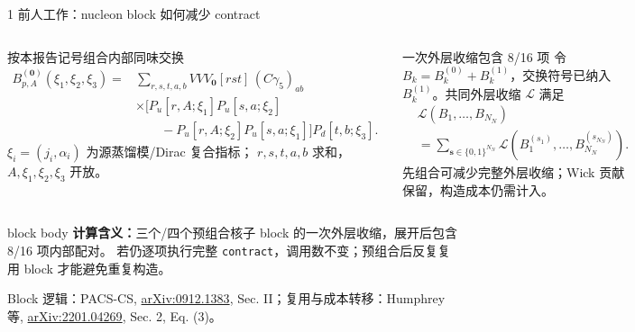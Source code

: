 \documentclass[aspectratio=169,UTF8,fontset=fandol]{ctexbeamer}
\newcommand{\smallnote}[1]{{\scriptsize\color{Muted}#1}}
\begin{document}
\begin{frame}{1 前人工作：nucleon block 如何减少 contract}
\scriptsize
\begin{columns}[T,onlytextwidth]
\begin{block}{按本报告记号组合内部同味交换}
\scriptsize
\setlength{\jot}{1pt}
\[
\begin{aligned}
B_{p,A}^{(\mathbf0)}(\xi_1,\xi_2,\xi_3)
={}&\sum_{r,s,t,a,b}VVV_{\mathbf0}[rst]\,(C\gamma_5)_{ab}\\
&\times\Big[P_u[r,A;\xi_1]P_u[s,a;\xi_2]\\
&\qquad-P_u[r,A;\xi_2]P_u[s,a;\xi_1]\Big]P_d[t,b;\xi_3].
\end{aligned}
\]
\(\xi_i=(j_i,\alpha_i)\) 为源蒸馏模/Dirac 复合指标；
\(r,s,t,a,b\) 求和，\(A,\xi_1,\xi_2,\xi_3\) 开放。
\end{block}
\begin{block}{一次外层收缩包含 8/16 项}
\scriptsize
令 \(B_k=B_k^{(0)}+B_k^{(1)}\)，交换符号已纳入 \(B_k^{(1)}\)。共同外层收缩 \(\mathcal L\) 满足
\[
\begin{aligned}
&\mathcal L(B_1,\ldots,B_{N_N})\\
&=\sum_{\boldsymbol s\in\{0,1\}^{N_N}}
\mathcal L(B_1^{(s_1)},\ldots,B_{N_N}^{(s_{N_N})}).
\end{aligned}
\]
先组合可减少完整外层收缩；Wick 贡献保留，构造成本仍需计入。
\end{block}
\end{columns}
\vspace{0.45em}
\begin{beamercolorbox}[sep=0.45em,wd=\linewidth]{block body}
\scriptsize
\textbf{计算含义：}三个/四个预组合核子 block 的一次外层收缩，展开后包含 8/16 项内部配对。
若仍逐项执行完整 \texttt{contract}，调用数不变；预组合后反复复用 block 才能避免重复构造。
\end{beamercolorbox}
\vspace{0.25em}
\smallnote{Block 逻辑：PACS-CS, \href{https://arxiv.org/abs/0912.1383}{arXiv:0912.1383}, Sec. II；复用与成本转移：Humphrey 等, \href{https://arxiv.org/abs/2201.04269}{arXiv:2201.04269}, Sec. 2, Eq. (3)。}
\end{frame}
\end{document}
